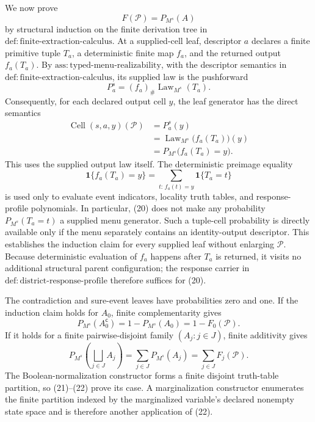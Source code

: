 We now prove
\[
 F(\mathcal P)=P_{M^s}(A)
\tag{17}
\]
by structural induction on the finite derivation tree in \(\mathrm{def:finite\text{-}extraction\text{-}calculus}\).  At a supplied-cell leaf, descriptor \(a\) declares a finite primitive tuple \(T_a\), a deterministic finite map \(f_a\), and the returned output \(f_a(T_a)\).  By \(\mathrm{ass:typed\text{-}menu\text{-}realizability}\), with the descriptor semantics in \(\mathrm{def:finite\text{-}extraction\text{-}calculus}\), its supplied law is the pushforward
\[
 P_a^s=(f_a)_\#\operatorname{Law}_{M^s}(T_a).
\tag{18}
\]
Consequently, for each declared output cell \(y\), the leaf generator has the direct semantics
\[
 \begin{aligned}
 \operatorname{Cell}(s,a,y)(\mathcal P)
 &=P_a^s(y)\\
 &=\operatorname{Law}_{M^s}\!\bigl(f_a(T_a)\bigr)(y)\\
 &=P_{M^s}\!\bigl(f_a(T_a)=y\bigr).
 \end{aligned}
\tag{19}
\]
This uses the supplied output law itself.  The deterministic preimage equality
\[
 \mathbf 1\{f_a(T_a)=y\}
 =\sum_{t:\,f_a(t)=y}\mathbf 1\{T_a=t\}
\tag{20}
\]
is used only to evaluate event indicators, locality truth tables, and response-profile polynomials.  In particular, (20) does not make any probability \(P_{M^s}(T_a=t)\) a supplied menu generator.  Such a tuple-cell probability is directly available only if the menu separately contains an identity-output descriptor.  This establishes the induction claim for every supplied leaf without enlarging \(\mathcal P\).  Because deterministic evaluation of \(f_a\) happens after \(T_a\) is returned, it visits no additional structural parent configuration; the response carrier in \(\mathrm{def:district\text{-}response\text{-}profile}\) therefore suffices for (20).

The contradiction and sure-event leaves have probabilities zero and one.  If the induction claim holds for \(A_0\), finite complementarity gives
\[
 P_{M^s}(A_0^{\mathsf c})
 =1-P_{M^s}(A_0)
 =1-F_0(\mathcal P).
\tag{21}
\]
If it holds for a finite pairwise-disjoint family \((A_j:j\in J)\), finite additivity gives
\[
 P_{M^s}\!\left(\bigsqcup_{j\in J}A_j\right)
 =\sum_{j\in J}P_{M^s}(A_j)
 =\sum_{j\in J}F_j(\mathcal P).
\tag{22}
\]
The Boolean-normalization constructor forms a finite disjoint truth-table partition, so (21)--(22) prove its case.  A marginalization constructor enumerates the finite partition indexed by the marginalized variable's declared nonempty state space and is therefore another application of (22).

